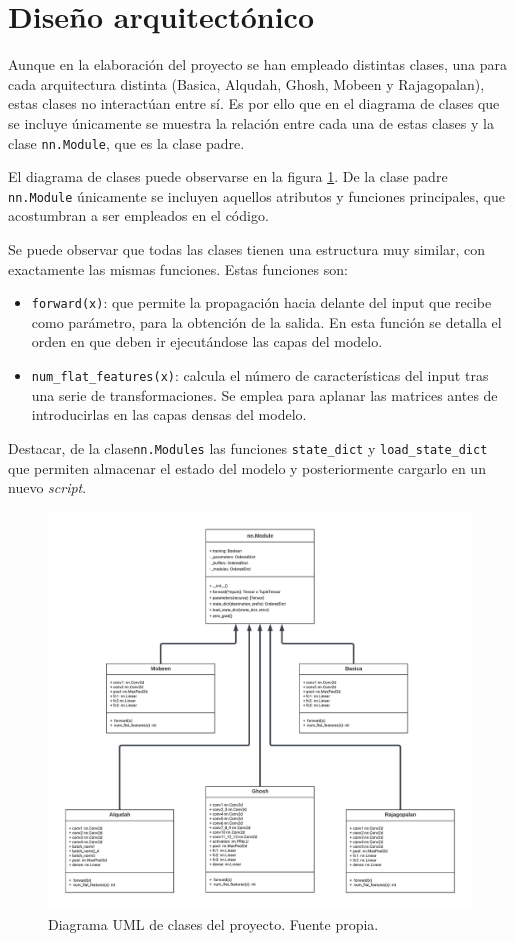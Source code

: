 
\section{Diseño arquitectónico}

Aunque en la elaboración del proyecto se han empleado distintas clases, una para cada arquitectura distinta (Basica, Alqudah, Ghosh, Mobeen y Rajagopalan), estas clases no interactúan entre sí. Es por ello que en el diagrama de clases que se incluye únicamente se muestra la relación entre cada una de estas clases y la clase \texttt{nn.Module}, que es la clase padre.

El diagrama de clases puede observarse en la figura \ref{fig:uml}. De la clase padre \texttt{nn.Module} únicamente se incluyen aquellos atributos y funciones principales, que acostumbran a ser empleados en el código.

Se puede observar que todas las clases tienen una estructura muy similar, con exactamente las mismas funciones. Estas funciones son:
\begin{itemize}
    \item \texttt{forward(x)}: que permite la propagación hacia delante del input que recibe como parámetro, para la obtención de la salida. En esta función se detalla el orden en que deben ir ejecutándose las capas del modelo.
    \item \texttt{num\_flat\_features(x)}: calcula el número de características del input tras una serie de transformaciones. Se emplea para aplanar las matrices antes de introducirlas en las capas densas del modelo.
\end{itemize}

Destacar, de la clase\texttt{nn.Modules} las funciones \texttt{state\_dict} y \texttt{load\_state\_dict} que permiten almacenar el estado del modelo y posteriormente cargarlo en un nuevo \textit{script}.

\begin{figure}[h]
    \centering
    \includegraphics[width=1\textwidth]{img/UML_proyecto.png}
    \caption{Diagrama UML de clases del proyecto. Fuente propia.}
    \label{fig:uml}
\end{figure}

